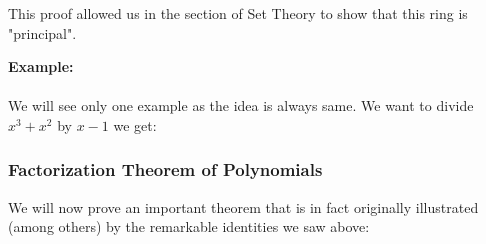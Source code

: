 	\begin{tcolorbox}[title=Remark,colframe=black,arc=10pt]
	This proof allowed us in the section of Set Theory to show that this ring is "principal".
	\end{tcolorbox}
	\begin{tcolorbox}[colframe=black,colback=white,sharp corners]
	\textbf{{\Large {}}Example:}\\\\
	We will see only one example as the idea is always same. We want to divide $x^3+x^2$ by $x-1$ we get:
		
	\end{tcolorbox}
	
	
	\pagebreak
	\subsubsection{Factorization Theorem of Polynomials}\label{factorization theorem}
	We will now prove an important theorem that is in fact originally illustrated (among others) by the remarkable identities we saw above:
	
